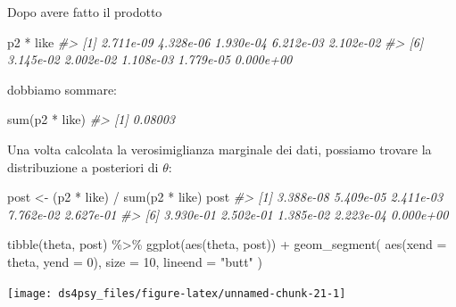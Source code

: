 \documentclass[
  11pt,
]{krantz}
\makeatletter
\newenvironment{Shaded}{\begin{snugshade}}{\end{snugshade}}
\newcommand{\AttributeTok}[1]{\textcolor[rgb]{0.61,0.61,0.61}{#1}}
\newcommand{\CommentTok}[1]{\textcolor[rgb]{0.37,0.37,0.37}{\textit{#1}}}
\newcommand{\DecValTok}[1]{\textcolor[rgb]{0.06,0.06,0.06}{#1}}
\newcommand{\FunctionTok}[1]{\textcolor[rgb]{0,0,0}{#1}}
\newcommand{\NormalTok}[1]{#1}
\newcommand{\OtherTok}[1]{\textcolor[rgb]{0.37,0.37,0.37}{#1}}
\newcommand{\SpecialCharTok}[1]{\textcolor[rgb]{0,0,0}{#1}}
\newcommand{\StringTok}[1]{\textcolor[rgb]{0.5,0.5,0.5}{#1}}
\newenvironment{kframe}{%
\medskip{}
\setlength{\fboxsep}{.8em}
 \def\at@end@of@kframe{}%
 \ifinner\ifhmode%
  \def\at@end@of@kframe{\end{minipage}}%
  \begin{minipage}{\columnwidth}%
 \fi\fi%
 \def\FrameCommand##1{\hskip\@totalleftmargin \hskip-\fboxsep
 \colorbox{shadecolor}{##1}\hskip-\fboxsep
     \hskip-\linewidth \hskip-\@totalleftmargin \hskip\columnwidth}%
 \MakeFramed {\advance\hsize-\width
   \@totalleftmargin\z@ \linewidth\hsize
   \@setminipage}}%
 {\par\unskip\endMakeFramed%
 \at@end@of@kframe}
\renewenvironment{Shaded}{\begin{kframe}}{\end{kframe}}
\theoremstyle{definition}
\theoremstyle{definition}
\theoremstyle{definition}
\theoremstyle{definition}
\theoremstyle{remark}
\makeatother
\begin{document}
Dopo avere fatto il prodotto

\begin{Shaded}
\begin{Highlighting}[]
\NormalTok{p2 }\SpecialCharTok{*}\NormalTok{ like}
\CommentTok{\#\textgreater{}  [1] 2.711e{-}09 4.328e{-}06 1.930e{-}04 6.212e{-}03 2.102e{-}02}
\CommentTok{\#\textgreater{}  [6] 3.145e{-}02 2.002e{-}02 1.108e{-}03 1.779e{-}05 0.000e+00}
\end{Highlighting}
\end{Shaded}

dobbiamo sommare:

\begin{Shaded}
\begin{Highlighting}[]
\FunctionTok{sum}\NormalTok{(p2 }\SpecialCharTok{*}\NormalTok{ like)}
\CommentTok{\#\textgreater{} [1] 0.08003}
\end{Highlighting}
\end{Shaded}

Una volta calcolata la verosimiglianza marginale dei dati, possiamo trovare la distribuzione a posteriori di \(\theta\):

\begin{Shaded}
\begin{Highlighting}[]
\NormalTok{post }\OtherTok{\textless{}{-}}\NormalTok{ (p2 }\SpecialCharTok{*}\NormalTok{ like) }\SpecialCharTok{/} \FunctionTok{sum}\NormalTok{(p2 }\SpecialCharTok{*}\NormalTok{ like)}
\NormalTok{post}
\CommentTok{\#\textgreater{}  [1] 3.388e{-}08 5.409e{-}05 2.411e{-}03 7.762e{-}02 2.627e{-}01}
\CommentTok{\#\textgreater{}  [6] 3.930e{-}01 2.502e{-}01 1.385e{-}02 2.223e{-}04 0.000e+00}
\end{Highlighting}
\end{Shaded}

\begin{Shaded}
\begin{Highlighting}[]
\FunctionTok{tibble}\NormalTok{(theta, post) }\SpecialCharTok{\%\textgreater{}\%}
  \FunctionTok{ggplot}\NormalTok{(}\FunctionTok{aes}\NormalTok{(theta, post)) }\SpecialCharTok{+}
  \FunctionTok{geom\_segment}\NormalTok{(}
    \FunctionTok{aes}\NormalTok{(}\AttributeTok{xend =}\NormalTok{ theta, }\AttributeTok{yend =} \DecValTok{0}\NormalTok{),}
    \AttributeTok{size =} \DecValTok{10}\NormalTok{, }\AttributeTok{lineend =} \StringTok{"butt"}
\NormalTok{  )}
\end{Highlighting}
\end{Shaded}

\begin{center}\texttt{[image: ds4psy\_files/figure-latex/unnamed-chunk-21-1]} \end{center}
\end{document}

